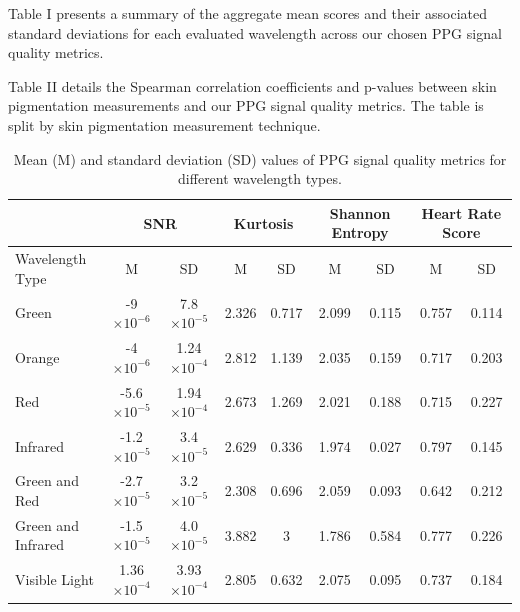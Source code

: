 \documentclass[letterpaper, 10 pt, conference]{ieeeconf}  %
\begin{document}
Table I presents a  summary of the aggregate mean scores and their associated standard deviations for each evaluated wavelength across our chosen PPG signal quality metrics. 

Table II details the Spearman correlation coefficients and p-values between skin pigmentation measurements and our PPG signal quality metrics. The table is split by skin pigmentation measurement technique. 
\begin{table}[!t]
\centering
\begin{tabular}{@{}lcccccccc@{}}
\toprule
& \multicolumn{2}{c}{SNR} & \multicolumn{2}{c}{Kurtosis} & \multicolumn{2}{c}{Shannon Entropy} & \multicolumn{2}{c}{Heart Rate Score} \\ \midrule
Wavelength Type   & M & SD & M & SD & M & SD & M & SD \\ \midrule
Green             & -9$\times10^{-6}$   & 7.8$\times10^{-5}$  & 2.326  & 0.717  & 2.099  & 0.115  & 0.757  & 0.114  \\
Orange            & -4$\times10^{-6}$   & 1.24$\times10^{-4}$ & 2.812  & 1.139  & 2.035  & 0.159  & 0.717  & 0.203  \\
Red               & -5.6$\times10^{-5}$ & 1.94$\times10^{-4}$ & 2.673  & 1.269  & 2.021  & 0.188  & 0.715  & 0.227  \\
Infrared          & -1.2$\times10^{-5}$ & 3.4$\times10^{-5}$  & 2.629  & 0.336  & 1.974  & 0.027  & 0.797  & 0.145  \\
Green and Red     & -2.7$\times10^{-5}$ & 3.2$\times10^{-5}$  & 2.308  & 0.696  & 2.059  & 0.093  & 0.642  & 0.212  \\
Green and Infrared & -1.5$\times10^{-5}$ & 4.0$\times10^{-5}$  & 3.882  & 3      & 1.786  & 0.584  & 0.777  & 0.226  \\
Visible Light     & 1.36$\times10^{-4}$ & 3.93$\times10^{-4}$ & 2.805  & 0.632  & 2.075  & 0.095  & 0.737  & 0.184  \\ \bottomrule
\end{tabular}
\caption{Mean (M) and standard deviation (SD) values of PPG signal quality metrics for different wavelength types.}
\label{fig:4}
\end{table}
\end{document}
